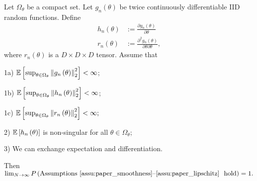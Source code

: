 \begin{prop}
\label{prop:assumptions_hold}Let $\Omega_{\theta}$ be a compact
set. Let $g_{n}\left(\theta\right)$ be twice continuously differentiable
IID random functions. Define
\begin{align*}
h_{n}\left(\theta\right) & :=\frac{\partial g{}_{n}\left(\theta\right)}{\partial\theta}\\
r_{n}\left(\theta\right) & :=\frac{\partial^{2}g{}_{n}\left(\theta\right)}{\partial\theta\partial\theta},
\end{align*}
where $r_{n}\left(\theta\right)$ is a $D\times D\times D$ tensor.
Assume that

1a) $\mathbb{E}\left[\sup_{\theta\in\Omega_{\theta}}\left\Vert g_{n}\left(\theta\right)\right\Vert_{2}^{2}\right]<\infty$;

1b) $\mathbb{E}\left[\sup_{\theta\in\Omega_{\theta}}\left\Vert h_{n}\left(\theta\right)\right\Vert_{2}^{2}\right]<\infty$;

1c) $\mathbb{E}\left[\sup_{\theta\in\Omega_{\theta}}\left\Vert r_{n}\left(\theta\right)\right\Vert_{2}^{2}\right]<\infty;$

2) $\mathbb{E}\left[h_{n}\left(\theta\right)\right]$ is non-singular for
all $\theta\in\Omega_{\theta}$;

3) We can exchange expectation and differentiation.

Then $\lim_{N\rightarrow\infty}P\left(\textrm{\coreassum\ hold}\right)=1.$
\end{prop}
%
